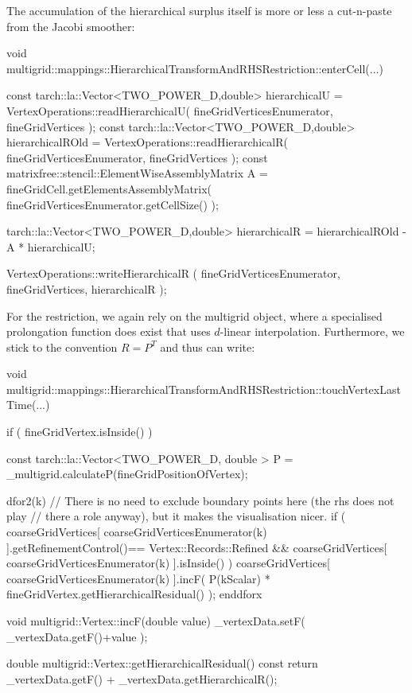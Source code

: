 \noindent
The accumulation of the hierarchical surplus itself is more or less a
cut-n-paste from the Jacobi smoother:
\begin{code}

void multigrid::mappings::HierarchicalTransformAndRHSRestriction::enterCell(...) { 
  const tarch::la::Vector<TWO_POWER_D,double> hierarchicalU    =
     VertexOperations::readHierarchicalU( fineGridVerticesEnumerator, fineGridVertices );
   const tarch::la::Vector<TWO_POWER_D,double> hierarchicalROld =
     VertexOperations::readHierarchicalR( fineGridVerticesEnumerator, fineGridVertices );
   const matrixfree::stencil::ElementWiseAssemblyMatrix A =
     fineGridCell.getElementsAssemblyMatrix( fineGridVerticesEnumerator.getCellSize() );

   tarch::la::Vector<TWO_POWER_D,double> hierarchicalR = 
     hierarchicalROld - A * hierarchicalU;

   VertexOperations::writeHierarchicalR
     ( fineGridVerticesEnumerator, fineGridVertices, hierarchicalR );
}
\end{code}

\noindent 
For the restriction, we again rely on the multigrid object, where a specialised
prolongation function does exist that uses $d$-linear interpolation.
Furthermore, we stick to the convention $R=P^T$ and thus can write:

\begin{code}
void
multigrid::mappings::HierarchicalTransformAndRHSRestriction::touchVertexLastTime(...) {
  if ( fineGridVertex.isInside() ) {
    const tarch::la::Vector<TWO_POWER_D, double > P = 
      _multigrid.calculateP(fineGridPositionOfVertex);

    dfor2(k)
      // There is no need to exclude boundary points here (the rhs does not play
      // there a role anyway), but it makes the visualisation nicer.
      if (
        coarseGridVertices[ coarseGridVerticesEnumerator(k) ].getRefinementControl()==
          Vertex::Records::Refined
        &&
        coarseGridVertices[ coarseGridVerticesEnumerator(k) ].isInside()
      ) {
        coarseGridVertices[ coarseGridVerticesEnumerator(k) ].incF(  
          P(kScalar) * fineGridVertex.getHierarchicalResidual() 
        );
      }
    enddforx
  }
}

void multigrid::Vertex::incF(double value) {
  _vertexData.setF( _vertexData.getF()+value );
}

double multigrid::Vertex::getHierarchicalResidual() const {
  return _vertexData.getF() + _vertexData.getHierarchicalR();
}
\end{code}


